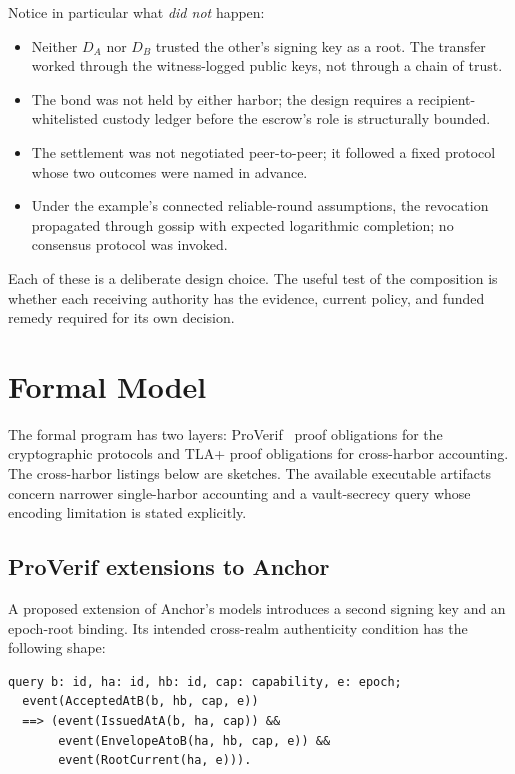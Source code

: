 \documentclass[11pt,a4paper]{article}
\theoremstyle{definition}
\theoremstyle{remark}
\begin{document}
Notice in particular what \emph{did not} happen:

\begin{itemize}[nosep]
\item Neither $D_A$ nor $D_B$ trusted the other's signing key as a root. The transfer worked through the witness-logged public keys, not through a chain of trust.
\item The bond was not held by either harbor; the design requires a recipient-whitelisted custody ledger before the escrow's role is structurally bounded.
\item The settlement was not negotiated peer-to-peer; it followed a fixed protocol whose two outcomes were named in advance.
\item Under the example's connected reliable-round assumptions, the revocation propagated through gossip with expected logarithmic completion; no consensus protocol was invoked.
\end{itemize}

Each of these is a deliberate design choice. The useful test of the composition is whether each receiving authority has
the evidence, current policy, and funded remedy required for its own decision.

\section{Formal Model}\label{sec:fh-formal}

The formal program has two layers: ProVerif~ proof obligations for the cryptographic protocols and TLA+ proof obligations for cross-harbor accounting. The cross-harbor listings below are sketches. The available executable artifacts concern narrower single-harbor accounting and a vault-secrecy query whose encoding limitation is stated explicitly.

\subsection{ProVerif extensions to Anchor}\label{sec:fh-proverif-ext}

A proposed extension of Anchor's models introduces a second signing key and an epoch-root binding. Its intended cross-realm authenticity condition has the following shape:

\begin{lstlisting}[caption={Cross-realm authenticity query (sketch)},style=proverif]
query b: id, ha: id, hb: id, cap: capability, e: epoch;
  event(AcceptedAtB(b, hb, cap, e))
  ==> (event(IssuedAtA(b, ha, cap)) &&
       event(EnvelopeAtoB(ha, hb, cap, e)) &&
       event(RootCurrent(ha, e))).
\end{lstlisting}
\end{document}
